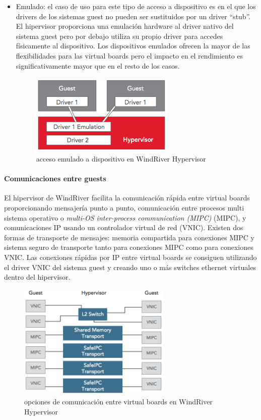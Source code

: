 \begin{itemize}
  \item Emulado: el caso de uso para este tipo de acceso a dispositivo es en el que los drivers de los sistemas guest no pueden ser sustituidos por un driver ``stub''. El hipervisor proporciona una emulación hardware al driver nativo del sistema guest pero por debajo utiliza su propio driver para accedes físicamente al dispositivo. Los dispositivos emulados ofrecen la mayor de las flexibilidades para las virtual boards pero el impacto en el rendimiento es significativamente mayor que en el resto de los casos.
  \begin{figure}[!htb]
  	\centering
  	\includegraphics[width=0.65\textwidth]{recursos/windriver_drv_3.png}
  	\caption{acceso emulado a dispositivo en WindRiver Hypervisor}
  	\label{fig:windriver_drv_3}
  \end{figure}

\end{itemize}

\paragraph{Comunicaciones entre guests}
El hipervisor de WindRiver facilita la comunicación rápida entre virtual boards proporcionando mensajería punto a punto, comunicación entre procesos multi sistema operativo o \textit{multi-OS inter-process communication (MIPC)} (MIPC), y comunicaciones IP usando un controlador virtual de red (VNIC). Existen dos formas de transporte de mensajes: memoria compartida para conexiones MIPC y sistema seguro de transporte tanto para conexiones MIPC como para conexiones VNIC. Las conexiones rápidas por IP entre virtual boards se consiguen utilizando el driver VNIC del sistema guest y creando uno o más switches ethernet virtuales dentro del hipervisor.
\begin{figure}[!htb]
  \centering
  \includegraphics[width=0.65\textwidth]{recursos/windriver_com.png}
  \caption{opciones de comunicación entre virtual boards en WindRiver Hypervisor}
  \label{fig:windriver_com}
\end{figure}

